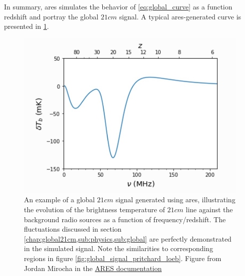 \documentclass[12pt, TexShade, letterpaper]{report}
\begin{document}
In summary, \gls{ares} simulates the behavior of \ref{eq:global_curve} as a function redshift and portray the global $21cm$ signal. A typical \gls{ares}-generated curve is presented in \ref{fig:ares_Curve}. \par
\begin{figure}[h!]
    \centering
    \includegraphics[scale =0.8]{ares_curve.jpg}
    \caption[Typical global $21cm$ curve generated using \gls{ares}]{An example of a global $21cm$ signal generated using \gls{ares}, illustrating the evolution of the brightness temperature of $21cm$ line against the background radio sources as a function of frequency/redshift. The fluctuations discussed in section \ref{chap:global21cm,sub:physics,sub:global} are perfectly demonstrated in the simulated signal. Note the similarities to corresponding regions in figure \ref{fig:global_signal_pritchard_loeb}. Figure from Jordan Mirocha in the \hyperlink{https://ares.readthedocs.io/en/latest/examples/example_gs_standard.html}{ARES documentation}}
    \label{fig:ares_Curve}
\end{figure}
\end{document}
